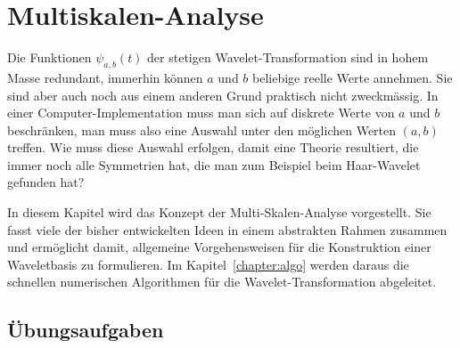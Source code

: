 %
%
%
\chapter{Multiskalen-Analyse
\label{chapter:msa}}
Die Funktionen $\psi_{a,b}(t)$ der stetigen Wavelet-Transformation
sind in hohem Masse redundant, immerhin können $a$ und $b$ beliebige
reelle Werte annehmen.
Sie sind aber auch noch aus einem anderen Grund praktisch nicht
zweckmässig.
In einer Computer-Implementation muss man sich auf diskrete Werte 
von $a$ und $b$ beschränken, man muss also eine Auswahl unter den möglichen
Werten $(a,b)$ treffen.
Wie muss diese Auswahl erfolgen, damit eine Theorie resultiert, die
immer noch alle Symmetrien hat, die man zum Beispiel beim Haar-Wavelet
gefunden hat?

In diesem Kapitel wird das Konzept der Multi-Skalen-Analyse vorgestellt.
Sie fasst viele der bisher entwickelten Ideen in einem abstrakten
Rahmen zusammen und ermöglicht damit, allgemeine Vorgehensweisen für die
Konstruktion einer Waveletbasis zu formulieren.
Im Kapitel~\ref{chapter:algo} werden daraus die schnellen numerischen
Algorithmen für die Wavelet-Transformation abgeleitet.






\section*{Übungsaufgaben}

